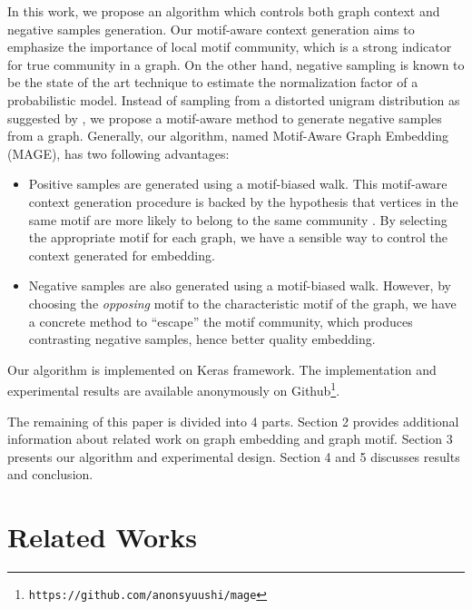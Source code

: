 \documentclass[letterpaper]{article}
\begin{document}
        In this work, we propose an algorithm which controls both graph context and negative samples
        generation. Our motif-aware context generation aims to emphasize the importance of local
        motif community, which is a strong indicator for true community in a graph. On the other hand,
        negative sampling is known to be the state of the art technique to estimate the normalization
        factor of a probabilistic model. Instead of sampling from a distorted unigram distribution as
        suggested by \cite{skipgram}, we propose a motif-aware method to generate 
        negative samples from a graph. Generally, our algorithm, named Motif-Aware Graph Embedding (MAGE),
        has two following advantages:

        \begin{itemize}
            \setlength{\parskip}{0pt}
            \item Positive samples are generated using a motif-biased walk. This motif-aware context 
                generation procedure is backed by the hypothesis that vertices in the same motif
                are more likely to belong to the same community \cite{juremotif}.
                By selecting the appropriate motif for each graph, we have a sensible way to control
                the context generated for embedding.
            \item Negative samples are also generated using a motif-biased walk. However, by choosing
                the \emph{opposing} motif to the characteristic motif of the graph, we have a concrete
                method to ``escape'' the motif community, which produces contrasting negative
                samples, hence better quality embedding.
        \end{itemize}

        Our algorithm is implemented on Keras \cite{keras} framework. The implementation and experimental
        results are available anonymously on Github\footnote{\texttt{https://github.com/anonsyuushi/mage}}.

        The remaining of this paper is divided into 4 parts. Section 2 provides additional information
        about related work on graph embedding and graph motif. Section 3 presents our algorithm and
        experimental design. Section 4 and 5 discusses results and conclusion.

    \section{Related Works}
\end{document}

